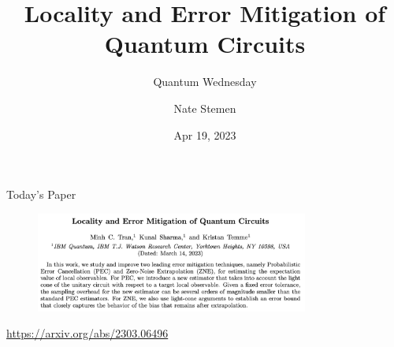 \documentclass[11pt,aspectratio=1610,xcolor=dvipsnames]{beamer}
\title{Locality and Error Mitigation of Quantum Circuits}
\subtitle{Quantum Wednesday}
\date{Apr 19, 2023}
\author{Nate Stemen}
\begin{document}
\maketitle

\begin{frame}{Today's Paper}
	\begin{figure}[h]
		\centering
		\includegraphics[width=0.8\textwidth]{paper.png}
	\end{figure}
	\begin{center}
		\url{https://arxiv.org/abs/2303.06496}
	\end{center}
\end{frame}
\end{document}
